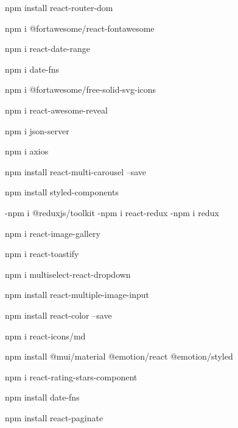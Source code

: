 
npm install react-router-dom

npm i @fortawesome/react-fontawesome

npm i react-date-range

npm i date-fns

npm i @fortawesome/free-solid-svg-icons

npm i react-awesome-reveal

npm i json-server

npm i axios

npm install react-multi-carousel --save

npm install styled-components

-npm i @reduxjs/toolkit -npm i react-redux  -npm i redux


npm i react-image-gallery

npm i react-toastify

npm i multiselect-react-dropdown

npm install react-multiple-image-input

npm install react-color --save

npm i react-icons/md


npm install @mui/material @emotion/react @emotion/styled

npm i react-rating-stars-component

npm install date-fns

npm install react-paginate
